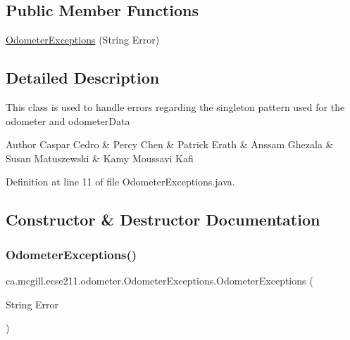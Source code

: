 \subsection*{Public Member Functions}
\begin{DoxyCompactItemize}
\item 
\hyperlink{classca_1_1mcgill_1_1ecse211_1_1odometer_1_1_odometer_exceptions_a25aa31baebe4906716a920929f0284d2}{Odometer\+Exceptions} (String Error)
\end{DoxyCompactItemize}


\subsection{Detailed Description}
This class is used to handle errors regarding the singleton pattern used for the odometer and odometer\+Data

\begin{DoxyAuthor}{Author}
Caspar Cedro \& Percy Chen \& Patrick Erath \& Anssam Ghezala \& Susan Matuszewski \& Kamy Moussavi Kafi 
\end{DoxyAuthor}


Definition at line 11 of file Odometer\+Exceptions.\+java.



\subsection{Constructor \& Destructor Documentation}
\mbox{\label{classca_1_1mcgill_1_1ecse211_1_1odometer_1_1_odometer_exceptions_a25aa31baebe4906716a920929f0284d2}} 
\subsubsection{\texorpdfstring{Odometer\+Exceptions()}{OdometerExceptions()}}
{\footnotesize\ttfamily ca.\+mcgill.\+ecse211.\+odometer.\+Odometer\+Exceptions.\+Odometer\+Exceptions (\begin{DoxyParamCaption}\item[{String}]{Error }\end{DoxyParamCaption})}

